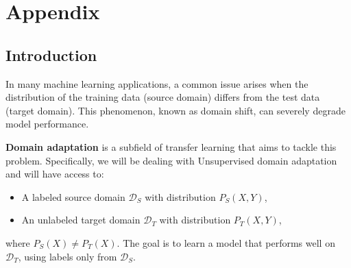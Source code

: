 \documentclass{article}
\begin{document}
\newpage
\section*{Appendix}


\subsection{Introduction}

In many machine learning applications, a common issue arises when the distribution of the training data (source domain) differs from the test data (target domain). This phenomenon, known as domain shift, can severely degrade model performance. 

\textbf{Domain adaptation} is a subfield of transfer learning that aims to tackle this problem. Specifically, we will be dealing with Unsupervised domain adaptation and will have access to:
\begin{itemize}[noitemsep]
    \item A labeled source domain \( \mathcal{D}_S \) with distribution \( P_S(X, Y) \),
    \item An unlabeled target domain \( \mathcal{D}_T \) with distribution \( P_T(X, Y) \),
\end{itemize}
where \( P_S(X) \neq P_T(X) \). The goal is to learn a model that performs well on \( \mathcal{D}_T \), using labels only from \( \mathcal{D}_S \).





\end{document}
